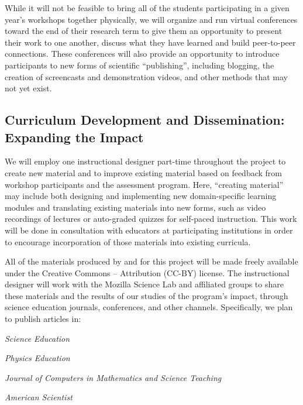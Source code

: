 \documentclass{proposalnsf}
\newlength{\up}
\begin{document}
While it will not be feasible to bring all of the students
participating in a given year's workshops together physically, we will
organize and run virtual conferences toward the end of their research
term to give them an opportunity to present their work to one another,
discuss what they have learned and build peer-to-peer connections.
These conferences will also provide an opportunity to introduce
participants to new forms of scientific ``publishing'', including
blogging, the creation of screencasts and demonstration videos, and
other methods that may not yet exist.

\subsection{Curriculum Development and Dissemination: Expanding the Impact}

We will employ one instructional designer part-time throughout the
project to create new material and to improve existing material based
on feedback from workshop participants and the assessment program.
Here, ``creating material'' may include both designing and
implementing new domain-specific learning modules and translating
existing materials into new forms, such as video recordings of
lectures or auto-graded quizzes for self-paced instruction.  This work
will be done in consultation with educators at participating
institutions in order to encourage incorporation of those materials
into existing curricula.

All of the materials produced by and for this project will be made
freely available under the Creative Commons -- Attribution (CC-BY)
license.  The instructional designer will work with the Mozilla
Science Lab and affiliated groups to share these materials and the
results of our studies of the program's impact, through science
education journals, conferences, and other channels. Specifically, we
plan to publish articles in:

\begin{compactitem}

\item
  \emph{Science Education}

\item
  \emph{Physics Education}

\item
  \emph{Journal of Computers in Mathematics and Science Teaching}

\item
  \emph{American Scientist}

\end{compactitem}
\end{document}
